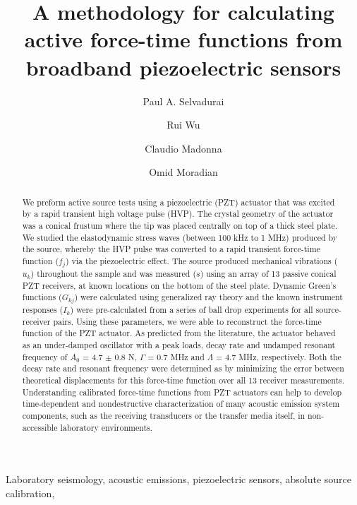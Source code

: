 \documentclass[preprint,3p, 11pt,authoryear]{elsarticle}
\begin{document}
\begin{frontmatter}



\title{A methodology for calculating active force-time functions from broadband piezoelectric sensors}

 \author[1]{Paul A. Selvadurai }
\author[2]{Rui Wu}
\author[3]{Claudio Madonna}
\author[2]{Omid Moradian}




\address[1]{Swiss Seismological Service, ETH Zurich, Zurich, Switzerland}
\address[2]{Engineering Geology Group, ETH Zurich, Zurich, Switzerland}
\address[3]{Department of Earth Sciences, ETH Zurich, Zurich, Switzerland}


\begin{abstract}
We preform active source tests using a piezoelectric (PZT) actuator that was excited by a rapid transient high voltage pulse (HVP). The crystal geometry of the actuator was a conical frustum where the tip was placed centrally on top of a thick steel plate. We studied the elastodynamic stress waves  (between 100 kHz to 1 MHz) produced by the source, whereby the HVP pulse was converted to a rapid transient force-time function ($f_{j}$) via the piezoelectric effect.  The source produced mechanical vibrations ($u_{k}$) throughout the sample and was measured ($s$) using an array of 13 passive conical PZT receivers, at known locations on the bottom of the steel plate. Dynamic Green's functions ($G_{kj}$) were calculated using generalized ray theory and the known instrument responses ($I_{k}$) were pre-calculated from a series of ball drop experiments for all source-receiver pairs. Using these parameters, we were able to reconstruct the force-time function of the PZT actuator. As predicted from the literature, the actuator behaved as an under-damped oscillator with a peak loads, decay rate and undamped resonant frequency of $A_{0}$ = 4.7 $\pm$ 0.8 N, $\Gamma$ = 0.7 MHz and $\Lambda$ = 4.7 MHz, respectively.  Both the decay rate and resonant frequency were determined as by minimizing the error between theoretical displacements for this force-time function over all 13 receiver measurements. Understanding calibrated force-time functions from PZT actuators can help to develop time-dependent and nondestructive characterization of many acoustic emission system components, such as the receiving transducers or the transfer media itself, in non-accessible laboratory environments. 
\end{abstract}

\begin{keyword}
Laboratory seismology, acoustic emissions,  piezoelectric sensors, absolute source calibration, 
\end{keyword}
\end{frontmatter}
\end{document}

